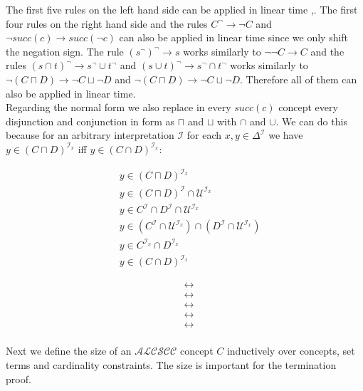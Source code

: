 \documentclass{book}
\theoremstyle{break}
\theoremstyle{definition}
\begin{document}
The first five rules on the left hand side can be applied in linear time \cite{1},\cite{6}. The first four rules on the right hand side and the rules $C^\neg\rightarrow \neg C$ and $\neg succ(c)\rightarrow succ(\neg c)$ can also be applied in linear time since we only shift the negation sign. The rule $(s^\neg)^\neg\rightarrow s$ works similarly to $\neg\neg C\rightarrow C$ and the rules $(s\cap t)^\neg\rightarrow s^\neg\cup t^\neg$ and $(s\cup t)^\neg\rightarrow s^\neg \cap t^\neg$ works similarly to $\neg(C\sqcap D)\rightarrow \neg C\sqcup \neg D$ and $\neg(C\sqcap D)\rightarrow \neg C\sqcup \neg D$. Therefore all of them can also be applied in linear time.\\
Regarding the normal form we also replace in every $succ(c)$ concept every disjunction and conjunction in form as $\sqcap$ and $\sqcup$ with $\cap$ and $\cup$. We can do this because for an arbitrary interpretation $\mathcal{I}$ for each $x,y\in\Delta^\mathcal{I}$ we have $y\in (C\sqcap D)^{\mathcal{I}_x}$ iff $y\in(C\cap D)^{\mathcal{I}_x}$:
\begin{figure}[H]
\begin{minipage}[t]{0.8\textwidth}
\begin{align*}
&y\in (C\sqcap D)^{\mathcal{I}_x}\\
&y\in (C\sqcap D)^\mathcal{I}\cap\mathcal{U}^{\mathcal{I}_x}\\
&y\in C^\mathcal{I}\cap D^\mathcal{I}\cap \mathcal{U}^{\mathcal{I}_x}\\
&y\in (C^\mathcal{I}\cap\mathcal{U}^{\mathcal{I}_x})\cap (D^\mathcal{I}\cap\mathcal{U}^{\mathcal{I}_x})\\
&y\in C^{\mathcal{I}_x}\cap D^{\mathcal{I}_x}\\\
&y\in (C\cap D)^{\mathcal{I}_x}
\end{align*}
\end{minipage}%
\begin{minipage}[t]{0.2\textwidth}
\begin{align*}
&\leftrightarrow\\
&\leftrightarrow\\
&\leftrightarrow\\
&\leftrightarrow\\
&\leftrightarrow\\
\end{align*}
\end{minipage}
\end{figure}
Next we define the size of an $\mathcal{ALCSCC}$ concept $C$ inductively over concepts, set terms and cardinality constraints. The size is important for the termination proof.
\end{document}
